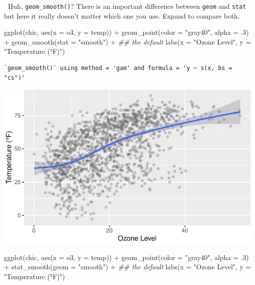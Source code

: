 \documentclass[
  letterpaper,
  DIV=11,
  numbers=noendperiod]{scrreprt}
\newenvironment{Shaded}{\begin{snugshade}}{\end{snugshade}}
\newcommand{\AttributeTok}[1]{\textcolor[rgb]{0.40,0.45,0.13}{#1}}
\newcommand{\DecValTok}[1]{\textcolor[rgb]{0.68,0.00,0.00}{#1}}
\newcommand{\DocumentationTok}[1]{\textcolor[rgb]{0.37,0.37,0.37}{\textit{#1}}}
\newcommand{\FunctionTok}[1]{\textcolor[rgb]{0.28,0.35,0.67}{#1}}
\newcommand{\NormalTok}[1]{\textcolor[rgb]{0.00,0.23,0.31}{#1}}
\newcommand{\SpecialCharTok}[1]{\textcolor[rgb]{0.37,0.37,0.37}{#1}}
\newcommand{\StringTok}[1]{\textcolor[rgb]{0.13,0.47,0.30}{#1}}
\begin{document}
💁 Huh, \texttt{geom\_smooth()}? There is an important difference
between \texttt{geom} and \texttt{stat} but here it really doesn't
matter which one you use. Expand to compare both.

\begin{Shaded}
\begin{Highlighting}[]
\FunctionTok{ggplot}\NormalTok{(chic, }\FunctionTok{aes}\NormalTok{(}\AttributeTok{x =}\NormalTok{ o3, }\AttributeTok{y =}\NormalTok{ temp)) }\SpecialCharTok{+}
  \FunctionTok{geom\_point}\NormalTok{(}\AttributeTok{color =} \StringTok{"gray40"}\NormalTok{, }\AttributeTok{alpha =}\NormalTok{ .}\DecValTok{3}\NormalTok{) }\SpecialCharTok{+}
  \FunctionTok{geom\_smooth}\NormalTok{(}\AttributeTok{stat =} \StringTok{"smooth"}\NormalTok{) }\SpecialCharTok{+} \DocumentationTok{\#\# the default}
  \FunctionTok{labs}\NormalTok{(}\AttributeTok{x =} \StringTok{"Ozone Level"}\NormalTok{, }\AttributeTok{y =} \StringTok{"Temperature (°F)"}\NormalTok{)}
\end{Highlighting}
\end{Shaded}

\begin{verbatim}
`geom_smooth()` using method = 'gam' and formula = 'y ~ s(x, bs = "cs")'
\end{verbatim}

\includegraphics{ch17_files/figure-pdf/geom-stat-smooth-a-1.pdf}

\begin{Shaded}
\begin{Highlighting}[]
\FunctionTok{ggplot}\NormalTok{(chic, }\FunctionTok{aes}\NormalTok{(}\AttributeTok{x =}\NormalTok{ o3, }\AttributeTok{y =}\NormalTok{ temp)) }\SpecialCharTok{+}
  \FunctionTok{geom\_point}\NormalTok{(}\AttributeTok{color =} \StringTok{"gray40"}\NormalTok{, }\AttributeTok{alpha =}\NormalTok{ .}\DecValTok{3}\NormalTok{) }\SpecialCharTok{+}
  \FunctionTok{stat\_smooth}\NormalTok{(}\AttributeTok{geom =} \StringTok{"smooth"}\NormalTok{) }\SpecialCharTok{+} \DocumentationTok{\#\# the default}
  \FunctionTok{labs}\NormalTok{(}\AttributeTok{x =} \StringTok{"Ozone Level"}\NormalTok{, }\AttributeTok{y =} \StringTok{"Temperature (°F)"}\NormalTok{)}
\end{Highlighting}
\end{Shaded}
\end{document}
